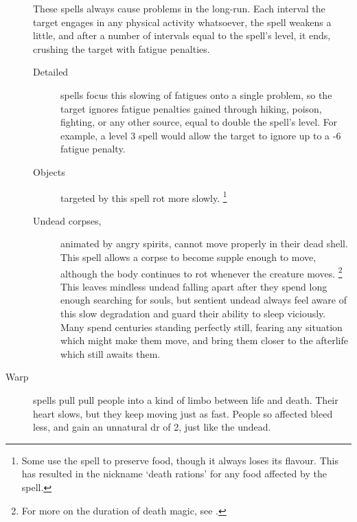 \begin{multicols}{2}
\begin{description}
    These spells always cause problems in the long-run.
    Each interval the target engages in any physical activity whatsoever, the spell weakens a little, and after a number of \glspl{interval} equal to the spell's level, it ends, crushing the target with \gls{fatigue} penalties.
    \begin{description}
      \item[Detailed]
        spells focus this slowing of \glspl{fatigue} onto a single problem, so the target ignores \gls{fatigue} penalties gained through hiking, poison, fighting, or any other source, equal to double the spell's level.
        For example, a level 3 spell would allow the target to ignore up to a -6 \gls{fatigue} penalty.
      \item[Objects]
        targeted by this spell rot more slowly.
        \footnote{Some use the spell to preserve food, though it always loses its flavour.
        This has resulted in the nickname `death rations' for any food affected by the spell.}
      \item[Undead corpses,]
        animated by angry spirits, cannot move properly in their dead shell.
        This spell allows a corpse to become supple enough to move, although the body continues to rot whenever the creature moves.%
        \footnote{For more on the duration of death magic, see .}
        This leaves mindless undead falling apart after they spend long enough searching for souls, but sentient undead always feel aware of this slow degradation and guard their ability to sleep viciously.
        Many spend centuries standing perfectly still, fearing any situation which might make them move, and bring them closer to the afterlife which still awaits them.
    \end{description}
  \item[Warp]
    spells pull pull people into a kind of limbo between life and death.
    Their heart slows, but they keep moving just as fast.
    People so affected bleed less, and gain an unnatural \gls{dr} of 2, just like the undead.


\end{description}
\end{multicols}
